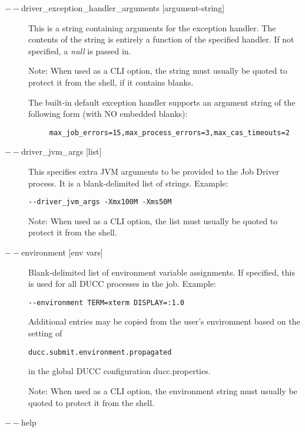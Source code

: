 \begin{description}
           \item[$--$driver\_exception\_handler\_arguments {[argument-string]}] This is a string
             containing arguments for the exception handler.  The contents of
             the string is entirely a function of the specified handler.  If not specified,
             a {\em null} is passed in.

             Note: When used as a CLI option, the string must usually be
             quoted to protect it from the shell, if it contains blanks.

             The built-in default exception handler supports an argument string of the following form
             (with NO embedded blanks):
\begin{verbatim}
     max_job_errors=15,max_process_errors=3,max_cas_timeouts=2
\end{verbatim}

           \item[$--$driver\_jvm\_args {[list]} ]

             This specifies extra JVM arguments to be provided to the Job Driver process. It is a blank-delimited 
             list of strings. Example: 
             \begin{verbatim}
--driver_jvm_args -Xmx100M -Xms50M 
             \end{verbatim}

             Note: When used as a CLI option, the list must usually be
             quoted to protect it from the shell.

           \item[$--$environment {[env vars]}] Blank-delimited list of environment variable
             assignments. If specified, this is used for all DUCC processes in the job. Example:
\begin{verbatim}
--environment TERM=xterm DISPLAY=:1.0
\end{verbatim}
             
             Additional entries may be copied from the user's environment based on the setting of
\begin{verbatim}
ducc.submit.environment.propagated
\end{verbatim}
             in the global DUCC configuration ducc.properties.

             Note: When used as a CLI option, the environment string must usually be
             quoted to protect it from the shell.

           \item[$--$help ]


\end{description}
